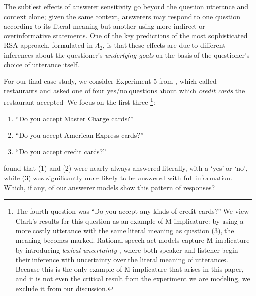 \documentclass[12pt, floatsintext, jou]{apa6}
\begin{document}
The subtlest effects of answerer sensitivity go beyond the question utterance and context alone; given the same context, answerers may respond to one question according to its literal meaning but another using more indirect or overinformative statements. One of the key predictions of the most sophisticated RSA approach, formulated in $A_2$, is that these effects are due to different inferences about the questioner's \emph{underlying goals} on the basis of the questioner's choice of utterance itself. 

For our final case study, we consider Experiment 5 from , which called restaurants and asked one of four yes/no questions about which \emph{credit cards} the restaurant accepted. We focus on the first three
\footnote{The fourth question was ``Do you accept any kinds of credit cards?'' We view Clark's results for this question as an example of M-implicature: by using a more costly utterance with the same literal meaning as question (3), the meaning becomes marked. Rational speech act models capture M-implicature by introducing \emph{lexical uncertainty} \cite{BergenGoodmanLevy12_Alternatives}, where both speaker and listener begin their inference with uncertainty over the literal meaning of utterances. %
Because this is the only example of M-implicature that arises in this paper, and it is not even the critical result from the experiment we are modeling, we exclude it from our discussion.%
}:
\begin{enumerate}
\item ``Do you accept Master Charge cards?'' 
\item ``Do you accept American Express cards?''
\item ``Do you accept credit cards?'' 
\end{enumerate}
 found that (1) and (2) were nearly always answered literally, with a `yes' or `no', while (3) was significantly more likely to be answered with full information. Which, if any, of our answerer models show this pattern of responses? %
\end{document}
